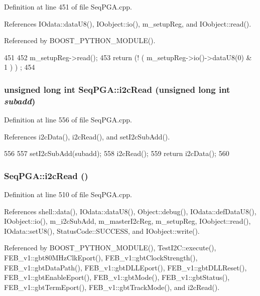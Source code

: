 Definition at line 451 of file SeqPGA.cpp.

References IOdata::dataU8(), IOobject::io(), m\_\-setupReg, and IOobject::read().

Referenced by BOOST\_\-PYTHON\_\-MODULE().


\begin{DoxyCode}
451                        {
452   m_setupReg->read();
453   return (! ( m_setupReg->io()->dataU8(0) & 1 ) ) ;
454 }
\end{DoxyCode}
\hypertarget{classSeqPGA_a9cf54d57d77b04f54cc0fe516c3528b4}{
\subsubsection[{i2cRead}]{\setlength{\rightskip}{0pt plus 5cm}unsigned long int SeqPGA::i2cRead (unsigned long int {\em subadd})}}
\label{classSeqPGA_a9cf54d57d77b04f54cc0fe516c3528b4}


Definition at line 556 of file SeqPGA.cpp.

References i2cData(), i2cRead(), and setI2cSubAdd().


\begin{DoxyCode}
556                                                          {
557   setI2cSubAdd(subadd);
558   i2cRead();
559   return i2cData();
560 }
\end{DoxyCode}
\hypertarget{classSeqPGA_a7cd344df2be99f3a02b487f80e87b27e}{
\subsubsection[{i2cRead}]{ SeqPGA::i2cRead ()}}
\label{classSeqPGA_a7cd344df2be99f3a02b487f80e87b27e}


Definition at line 510 of file SeqPGA.cpp.

References shell::data(), IOdata::dataU8(), Object::debug(), IOdata::defDataU8(), IOobject::io(), m\_\-i2cSubAdd, m\_\-masterI2cReg, m\_\-setupReg, IOobject::read(), IOdata::setU8(), StatusCode::SUCCESS, and IOobject::write().

Referenced by BOOST\_\-PYTHON\_\-MODULE(), TestI2C::execute(), FEB\_\-v1::gbt80MHzClkEport(), FEB\_\-v1::gbtClockStrength(), FEB\_\-v1::gbtDataPath(), FEB\_\-v1::gbtDLLEport(), FEB\_\-v1::gbtDLLReset(), FEB\_\-v1::gbtEnableEport(), FEB\_\-v1::gbtMode(), FEB\_\-v1::gbtStatus(), FEB\_\-v1::gbtTermEport(), FEB\_\-v1::gbtTrackMode(), and i2cRead().


